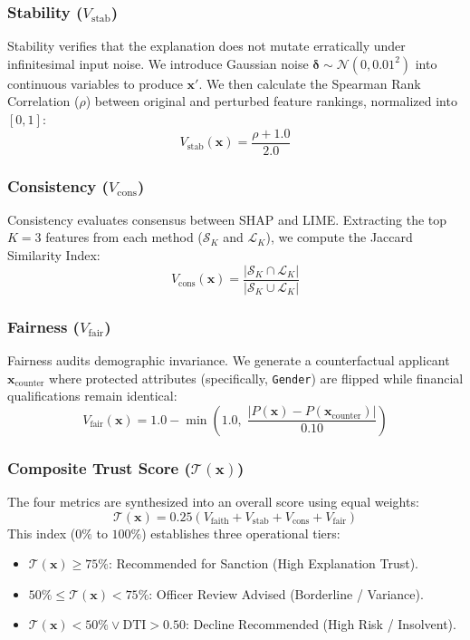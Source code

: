 \documentclass[conference]{IEEEtran}
\begin{document}
\subsubsection{Stability ($V_{\text{stab}}$)}
Stability verifies that the explanation does not mutate erratically under infinitesimal input noise. We introduce Gaussian noise $\mathbf{\delta} \sim \mathcal{N}(0, 0.01^2)$ into continuous variables to produce $\mathbf{x}'$. We then calculate the Spearman Rank Correlation ($\rho$) between original and perturbed feature rankings, normalized into $[0, 1]$:
\begin{equation}
    V_{\text{stab}}(\mathbf{x}) = \frac{\rho + 1.0}{2.0}
\end{equation}

\subsubsection{Consistency ($V_{\text{cons}}$)}
Consistency evaluates consensus between SHAP and LIME. Extracting the top $K=3$ features from each method ($\mathcal{S}_K$ and $\mathcal{L}_K$), we compute the Jaccard Similarity Index:
\begin{equation}
    V_{\text{cons}}(\mathbf{x}) = \frac{|\mathcal{S}_K \cap \mathcal{L}_K|}{|\mathcal{S}_K \cup \mathcal{L}_K|}
\end{equation}

\subsubsection{Fairness ($V_{\text{fair}}$)}
Fairness audits demographic invariance. We generate a counterfactual applicant $\mathbf{x}_{\text{counter}}$ where protected attributes (specifically, \texttt{Gender}) are flipped while financial qualifications remain identical:
\begin{equation}
    V_{\text{fair}}(\mathbf{x}) = 1.0 - \min\left(1.0, \; \frac{|P(\mathbf{x}) - P(\mathbf{x}_{\text{counter}})|}{0.10}\right)
\end{equation}

\subsubsection{Composite Trust Score ($\mathcal{T}(\mathbf{x})$)}
The four metrics are synthesized into an overall score using equal weights:
\begin{equation}
    \mathcal{T}(\mathbf{x}) = 0.25 \left( V_{\text{faith}} + V_{\text{stab}} + V_{\text{cons}} + V_{\text{fair}} \right)
\end{equation}
This index ($0\%$ to $100\%$) establishes three operational tiers:
\begin{itemize}
    \item $\mathcal{T}(\mathbf{x}) \ge 75\%$: Recommended for Sanction (High Explanation Trust).
    \item $50\% \le \mathcal{T}(\mathbf{x}) < 75\%$: Officer Review Advised (Borderline / Variance).
    \item $\mathcal{T}(\mathbf{x}) < 50\% \lor \text{DTI} > 0.50$: Decline Recommended (High Risk / Insolvent).
\end{itemize}
\end{document}
